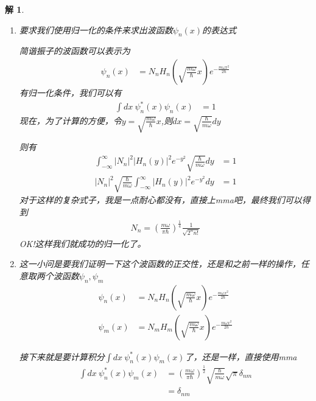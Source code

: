 \documentclass{article}
\newtheorem{solution}{解}
\begin{document}
\begin{solution}
\begin{enumerate}
        这个图中几乎已经看不到前几项厄米多项式了，而$H_6$的图像可以看得很清晰，这也就是说，厄米多项式在之后将会增长得非常快，挺让人担忧波函数会不会爆掉。
        \item[(4)] 要求我们使用归一化的条件来求出波函数$\psi_n(x)$的表达式
        
        简谐振子的波函数可以表示为
        \begin{align*}
            \psi_n(x)&=N_nH_n\left(\sqrt{\frac{m\omega}{\hbar}}x\right)e^{-\frac{m\omega x^2}{2\hbar}}
        \end{align*}
        有归一化条件，我们可以有
        \begin{align*}
            \int dx\ \psi_n^{*}(x)\psi_n(x)&=1
        \end{align*}
        现在，为了计算的方便，令$\displaystyle y=\sqrt{\frac{m\omega}{\hbar}}x$,则$\displaystyle dx=\sqrt{\frac{\hbar}{m\omega}}dy$

        则有
        \begin{align*}
            \int_{-\infty}^{\infty}|N_n|^2|H_n(y)|^2e^{-y^2}\sqrt{\frac{\hbar}{m\omega}}dy&=1\\
            |N_n|^2\sqrt{\frac{\hbar}{m\omega}}\int_{-\infty}^{\infty}|H_n(y)|^2e^{-y^2}dy&=1
        \end{align*}
        对于这样的复杂式子，我是一点耐心都没有，直接上mma吧，最终我们可以得到
        \begin{align*}
            N_n=\left(\frac{m\omega}{\pi\hbar}\right)^{\frac{1}{4}}\frac{1}{\sqrt{2^nn!}}
        \end{align*}
        OK!这样我们就成功的归一化了。

        \item[(5)] 这一小问是要我们证明一下这个波函数的正交性，还是和之前一样的操作，任意取两个波函数$\psi_n,\psi_m$
        \begin{align*}
            \psi_n(x)&=N_nH_n\left(\sqrt{\frac{m\omega}{\hbar}}x\right)e^{-\frac{m\omega x^2}{2\hbar}}\\
            \psi_m(x)&=N_mH_m\left(\sqrt{\frac{m\omega}{\hbar}}x\right)e^{-\frac{m\omega x^2}{2\hbar}}
        \end{align*}

        接下来就是要计算积分$\displaystyle\int dx\ \psi_n^{*}(x)\psi_m(x)$了，还是一样，直接使用mma
        \begin{align*}
            \int dx\ \psi_n^{*}(x)\psi_m(x)&=\left(\frac{m\omega}{\pi\hbar}\right)^{\frac{1}{2}}\sqrt{\frac{\hbar}{m\omega}}\sqrt{\pi}\delta_{nm}\\
            &=\delta_{nm}
        \end{align*}
    \end{enumerate}
\end{solution}
\end{document}
